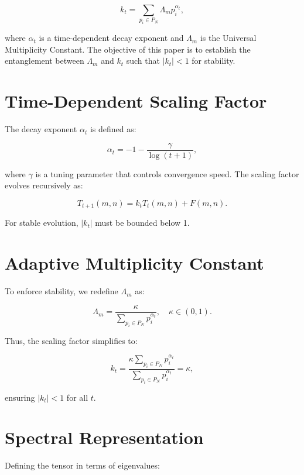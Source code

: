 \documentclass{article}
\theoremstyle{plain}
\begin{document}
\begin{equation}
    k_t = \sum_{p_i \in P_N} \Lambda_m p_i^{\alpha_t},
\end{equation}

where $\alpha_t$ is a time-dependent decay exponent and $\Lambda_m$ is the Universal Multiplicity Constant. The objective of this paper is to establish the entanglement between $\Lambda_m$ and $k_t$ such that $|k_t| < 1$ for stability.

\section{Time-Dependent Scaling Factor}
The decay exponent $\alpha_t$ is defined as:

\begin{equation}
    \alpha_t = -1 - \frac{\gamma}{\log(t+1)},
\end{equation}

where $\gamma$ is a tuning parameter that controls convergence speed. The scaling factor evolves recursively as:

\begin{equation}
    T_{t+1}(m,n) = k_t T_t(m,n) + F(m,n).
\end{equation}

For stable evolution, $|k_t|$ must be bounded below 1.

\section{Adaptive Multiplicity Constant}
To enforce stability, we redefine $\Lambda_m$ as:

\begin{equation}
    \Lambda_m = \frac{\kappa}{\sum_{p_i \in P_N} p_i^{\alpha_t}}, \quad \kappa \in (0,1).
\end{equation}

Thus, the scaling factor simplifies to:

\begin{equation}
    k_t = \frac{\kappa \sum_{p_i \in P_N} p_i^{\alpha_t}}{\sum_{p_i \in P_N} p_i^{\alpha_t}} = \kappa,
\end{equation}

ensuring $|k_t| < 1$ for all $t$.

\section{Spectral Representation}
Defining the tensor in terms of eigenvalues:
\end{document}
